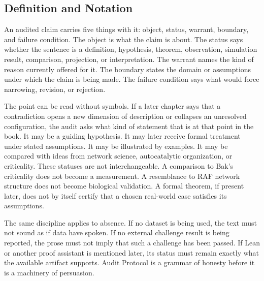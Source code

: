 \documentclass[11pt,a4paper,openany]{book}
\begin{document}
\subsection{Definition and Notation}
An audited claim carries five things with it: object, status, warrant, boundary, and failure condition. The object is what the claim is about. The status says whether the sentence is a definition, hypothesis, theorem, observation, simulation result, comparison, projection, or interpretation. The warrant names the kind of reason currently offered for it. The boundary states the domain or assumptions under which the claim is being made. The failure condition says what would force narrowing, revision, or rejection. \cite{kauffman_autocatalytic,raf_networks}\par
The point can be read without symbols. If a later chapter says that a contradiction opens a new dimension of description or collapses an unresolved configuration, the audit asks what kind of statement that is at that point in the book. It may be a guiding hypothesis. It may later receive formal treatment under stated assumptions. It may be illustrated by examples. It may be compared with ideas from network science, autocatalytic organization, or criticality. These statuses are not interchangeable. A comparison to Bak's criticality does not become a measurement. A resemblance to RAF network structure does not become biological validation. A formal theorem, if present later, does not by itself certify that a chosen real-world case satisfies its assumptions.\par
The same discipline applies to absence. If no dataset is being used, the text must not sound as if data have spoken. If no external challenge result is being reported, the prose must not imply that such a challenge has been passed. If Lean or another proof assistant is mentioned later, its status must remain exactly what the available artifact supports. Audit Protocol is a grammar of honesty before it is a machinery of persuasion.\par
\end{document}
